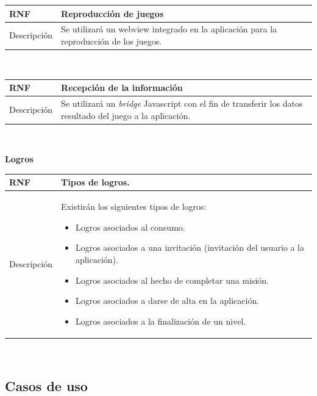 \documentclass[twoside]{report}
\newcommand\addrow[2]{#1 &#2\\ }
\newcommand\addheading[2]{#1 &#2\\ \hline}
\newcommand\tabularhead{\begin{tabular}{lp{0.7\textwidth}}
\hline
}
\newenvironment{req}{\tabularhead}
{\hline\end{tabular}}
\begin{document}
\begin{req}
	\addheading{\textbf{RNF\arabic{nonFunctionalRequirements}}}{Reproducción de juegos}
	\addrow{Descripción}{Se utilizará un webview integrado en la aplicación para la reproducción de los juegos.}
\end{req}\\

\begin{req}
	\addheading{\textbf{RNF\arabic{nonFunctionalRequirements}}}{Recepción de la información}
	\addrow{Descripción}{Se utilizará un \textit{bridge} Javascript con el fin de transferir los datos resultado del juego a la aplicación.}
\end{req}\\

\textbf{Logros}\\

\begin{req}
	\addheading{\textbf{RNF\arabic{nonFunctionalRequirements}}}{Tipos de logros.}
	\addrow{Descripción}{Existirán los siguientes tipos de logros:
	\begin{itemize}
	\item Logros asociados al consumo.
	\item Logros asociados a una invitación (invitación del usuario a la aplicación).
	\item Logros asociados al hecho de completar una misión.
	\item Logros asociados a darse de alta en la aplicación.
	\item Logros asociados a la finalización de un nivel.
	\end{itemize}}
\end{req}\\

\subsection{Casos de uso}
\end{document}
